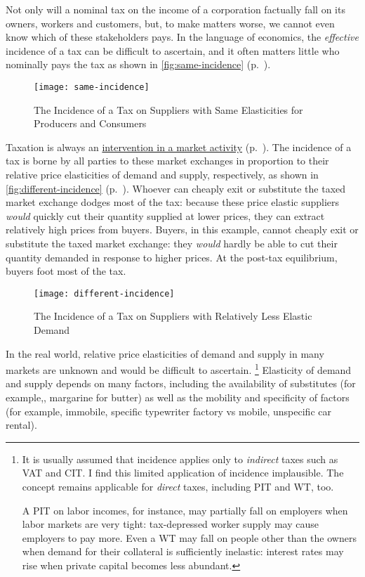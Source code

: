 Not only will a nominal tax on the income of a corporation factually fall on its owners, workers and customers, but, to make matters worse, we cannot even know which of these stakeholders pays.
In the language of economics, the \emph{effective} incidence of a tax can be difficult to ascertain, and it often matters little who nominally pays the tax as shown in \autoref{fig:same-incidence} (p.~\pageref{fig:same-incidence}).

 \begin{figure}[htbp]
	\centering
	\texttt{[image: same-incidence]}
	\caption[Incidence of a Tax on Suppliers with Unit-Elastic Supply and Demand]{The Incidence of a Tax on Suppliers with Same Elasticities for Producers and Consumers}
	\label{fig:same-incidence}
\end{figure}

Taxation is always an \hyperref[sec:market-vs-command]{intervention in a market activity} (p.~\pageref{sec:market-vs-command}).
The incidence of a tax is borne by all parties to these market exchanges in proportion to their relative price elasticities of demand and supply, respectively, as shown in \autoref{fig:different-incidence} (p.~\pageref{fig:different-incidence}).
Whoever can cheaply exit or substitute the taxed market exchange dodges most of the tax:
because these price elastic suppliers \emph{would} quickly cut their quantity supplied at lower prices, they can extract relatively high prices from buyers.
Buyers, in this example, cannot cheaply exit or substitute the taxed market exchange:
they \emph{would} hardly be able to cut their quantity demanded in response to higher prices.
At the post-tax equilibrium, buyers foot most of the tax.

 \begin{figure}[htbp]
	\centering
	\texttt{[image: different-incidence]}
	\caption[Incidence of a Tax on Suppliers with Relatively Inelastic Demand]{The Incidence of a Tax on Suppliers with Relatively Less Elastic Demand}
	\label{fig:different-incidence}
\end{figure}

In the real world, relative price elasticities of demand and supply in many markets are unknown and would be difficult to ascertain.
\footnote{
	It is usually assumed that incidence applies only to \emph{indirect} taxes such as \gls{VAT} and \gls{CIT}.
	I find this limited application of incidence implausible.
	The concept remains applicable for \emph{direct} taxes, including \gls{PIT} and \gls{WT}, too.

	A \gls{PIT} on labor incomes, for instance, may partially fall on employers when labor markets are very tight:
	tax-depressed worker supply may cause employers to pay more.
	Even a \gls{WT} may fall on people other than the owners when demand for their collateral is sufficiently inelastic:
	interest rates may rise when private capital becomes less abundant.
}
Elasticity of demand and supply depends on many factors, including the availability of substitutes (for example,, margarine for butter) as well as the mobility and specificity of factors (for example, immobile, specific typewriter factory vs mobile, unspecific car rental).

